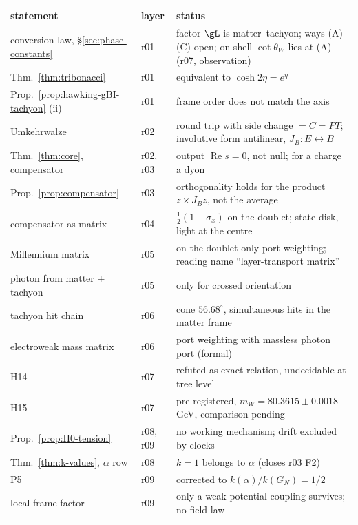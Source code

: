 \begin{center}
\small
\begin{tabular}{@{}>{\raggedright\arraybackslash}p{}>{\raggedright\arraybackslash}p{}>{\raggedright\arraybackslash}p{}@{}}
\toprule
statement & layer & status\\
\midrule
conversion law, \S\ref{sec:phase-constants} & r01 & factor \(\gL\) is matter--tachyon; ways (A)--(C) open; on-shell \(\cot\theta_W\) lies at (A) (r07, observation)\\
Thm.~\ref{thm:tribonacci} & r01 & equivalent to \(\cosh2\eta=e^\eta\)\\
Prop.~\ref{prop:hawking-gBI-tachyon} (ii) & r01 & frame order does not match the axis\\
Umkehrwalze & r02 & round trip with side change \(=C=PT\); involutive form antilinear, \(J_B\colon E\leftrightarrow B\)\\
Thm.~\ref{thm:core}, compensator & r02, r03 & output \(\operatorname{Re}s=0\), not null; for a charge a dyon\\
Prop.~\ref{prop:compensator} & r03 & orthogonality holds for the product \(z\times J_Bz\), not the average\\
compensator as matrix & r04 & \(\tfrac12(1+\sigma_x)\) on the doublet; state disk, light at the centre\\
Millennium matrix & r05 & on the doublet only port weighting; reading name ``layer-transport matrix''\\
photon from matter \(+\) tachyon & r05 & only for crossed orientation\\
tachyon hit chain & r06 & cone \(56.68^\circ\), simultaneous hits in the matter frame\\
electroweak mass matrix & r06 & port weighting with massless photon port (formal)\\
H14 & r07 & refuted as exact relation, undecidable at tree level\\
H15 & r07 & pre-registered, \(m_W=80.3615\pm0.0018\) GeV, comparison pending\\
Prop.~\ref{prop:H0-tension} & r08, r09 & no working mechanism; drift excluded by clocks\\
Thm.~\ref{thm:k-values}, \(\alpha\) row & r08 & \(k=1\) belongs to \(\alpha\) (closes r03 F2)\\
P5 & r09 & corrected to \(k(\alpha)/k(G_N)=1/2\)\\
local frame factor & r09 & only a weak potential coupling survives; no field law\\

\end{tabular}
\end{center}
